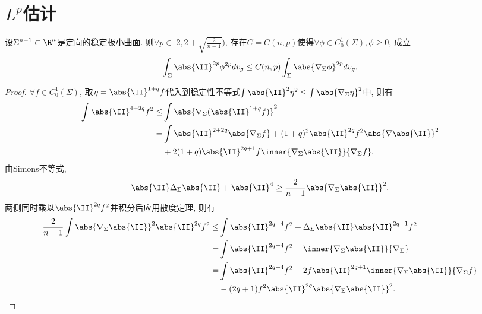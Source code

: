 \section{\texorpdfstring{$L^p$}{Lp}估计}
\begin{theorem} \label{ssy}
    设$\Sigma^{n-1}\subset \R^n$是定向的稳定极小曲面. 则$\forall p \in [2, 2+\sqrt{\frac{2}{n-1}})$, 存在$C=C(n,p)$使得$\forall \phi \in C^1_0(\Sigma), \phi \ge 0$, 成立 
    \begin{equation}\label{ssye}
        \int_\Sigma \abs{\II}^{2p}\phi^{2p}dv_g \le C(n,p) \int_\Sigma \abs{\nabla_\Sigma \phi}^{2p}dv_g.
    \end{equation}
\end{theorem}
\begin{proof}
    $\forall f \in C^1_0(\Sigma)$, 取$\eta=\abs{\II}^{1+q}f$代入到稳定性不等式$\int\abs{\II}^2 \eta^2\le \int \abs{\nabla_\Sigma \eta}^2$中, 则有
    \begin{equation} \label{ssy1}
        \begin{split}
            \int \abs{\II}^{4+2q}f^2  \le& \int \abs{\nabla_\Sigma (\abs{\II}^{1+q}f)}^2 \\
            =& \int \abs{\II}^{2+2q} \abs{\nabla_\Sigma f} + (1+q)^2 \abs{\II}^{2q}f^2 \abs{\nabla \abs{\II}}^2  \\
            &+ 2(1+q)\abs{\II}^{2q+1}f\inner{\nabla_\Sigma \abs{\II}}{\nabla_\Sigma f}.
        \end{split}
    \end{equation}
    由Simons不等式,
    \begin{equation}
        \abs{\II}\Delta_\Sigma\abs{\II} + \abs{\II}^4 \ge \frac{2}{n-1}\abs{\nabla_\Sigma \abs{\II}}^2.
    \end{equation}
    两侧同时乘以$\abs{\II}^{2q}f^2$并积分后应用散度定理, 则有
    \begin{equation} \label{ssy2}
        \begin{split}
            \frac{2}{n-1}\int \abs{\nabla_\Sigma \abs{\II}}^2 \abs{\II}^{2q}f^2 \le&  \int \abs{\II}^{2q+4}f^2 + \Delta_\Sigma \abs{\II} \abs{\II}^{2q+1}f^2 \\
            =&\int \abs{\II}^{2q+4}f^2-\inner{\nabla_\Sigma \abs{\II}}{\nabla_\Sigma}\\
            =&\int \abs{\II}^{2q+4}f^2-2f\abs{\II}^{2q+1}\inner{\nabla_\Sigma \abs{\II}}{\nabla_\Sigma f}\\
            &-(2q+1)f^2\abs{\II}^{2q} \abs{\nabla_\Sigma\abs{\II}}^2.
        \end{split}

\end{equation}
\end{proof}
